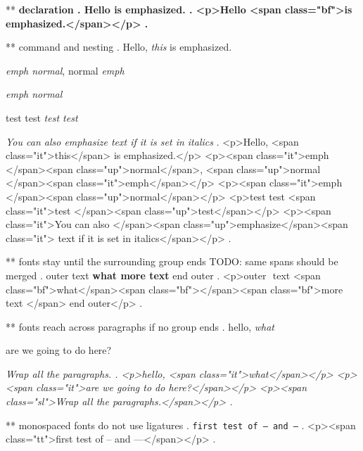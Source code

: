 ** \bfseries declaration
.
Hello \bfseries is emphasized.
.
<p>Hello <span class="bf">is emphasized.</span></p>
.

** \emph{} command and nesting
.
Hello, \emph{this} is emphasized.

\emph{emph \textup{normal}}, \textup{normal \emph{emph}}

\emph{emph \emph{normal}}

test {test \em\em\em test \em test}

\textit{You can also \emph{emphasize} text if it is set in italics}
.
<p>Hello, <span class="it">this</span> is emphasized.</p>
<p><span class="it">emph </span><span class="up">normal</span>, <span class="up">normal </span><span class="it">emph</span></p>
<p><span class="it">emph </span><span class="up">normal</span></p>
<p>test test <span class="it">test </span><span class="up">test</span></p>
<p><span class="it">You can also </span><span class="up">emphasize</span><span class="it"> text if it is set in italics</span></p>
.


** fonts stay until the surrounding group ends      TODO: same spans should be merged
.
outer { text \bfseries {what} more text } end outer
.
<p>outer ​ text <span class="bf">what</span><span class="bf">​ </span><span class="bf">more text </span>​ end outer</p>
.


** fonts reach across paragraphs if no group ends
.
hello, \itshape what

are we going to do here?

\slshape
Wrap all the paragraphs.
.
<p>hello, <span class="it">what</span></p>
<p><span class="it">are we going to do here?</span></p>
<p><span class="sl">Wrap all the paragraphs.</span></p>
.


** monospaced fonts do not use ligatures
.
\texttt{first test of -- and ---}
.
<p><span class="tt">first test of -- and ---</span></p>
.
